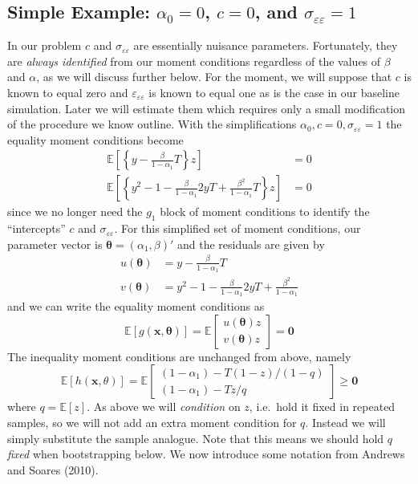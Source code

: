 \documentclass[12pt]{article}
\begin{document}
\subsection{Simple Example: $\alpha_0 = 0$, $c=0$, and $\sigma_{\varepsilon\varepsilon}=1$}
In our problem $c$ and $\sigma_{\varepsilon\varepsilon}$ are essentially nuisance parameters.
Fortunately, they are \emph{always identified} from our moment conditions regardless of the values of $\beta$ and $\alpha$, as we will discuss further below.
For the moment, we will suppose that $c$ is known to equal zero and $\varepsilon_{\varepsilon\varepsilon}$ is known to equal one as is the case in our baseline simulation.
Later we will estimate them which requires only a small modification of the procedure we know outline.
With the simplifications $\alpha_0, c=0, \sigma_{\varepsilon\varepsilon}=1$ the equality moment conditions become
\begin{align*}
  \mathbb{E}\left[ \left\{y - \frac{\beta}{1 - \alpha_1} T\right\}z \right] &= 0\\
  \mathbb{E}\left[ \left\{y^2 - 1 - \frac{\beta}{1 - \alpha_1} 2yT + \frac{\beta^2}{1 - \alpha_1} T\right\}z \right] &= 0 
\end{align*}
since we no longer need the $g_1$ block of moment conditions to identify the ``intercepts'' $c$ and $\sigma_{\varepsilon\varepsilon}$.
For this simplified set of moment conditions, our parameter vector is $\boldsymbol{\theta} = (\alpha_1, \beta)'$ and the residuals are given by
\begin{align*}
  u(\boldsymbol{\theta}) &= y - \frac{\beta}{1 - \alpha_1} T\\
  v(\boldsymbol{\theta}) &= y^2 - 1 - \frac{\beta}{1 - \alpha_1} 2yT + \frac{\beta^2}{1 - \alpha_1}
\end{align*}
and we can write the equality moment conditions as
\[
\mathbb{E}\left[ g(\mathbf{x}, \boldsymbol{\theta}) \right] = \mathbb{E}
  \left[
  \begin{array}{c}
    u(\boldsymbol{\theta}) z\\ v(\boldsymbol{\theta}) z
  \end{array}
\right] = \mathbf{0}
\]
The inequality moment conditions are unchanged from above, namely
\[
  \mathbb{E}\left[ h(\mathbf{x},\theta) \right] = \mathbb{E}
  \left[
  \begin{array}{c}
    (1 - \alpha_1) - T(1 - z)/(1 - q)\\
    (1 - \alpha_1) - Tz/q
  \end{array}
\right] \geq \mathbf{0}
\]
where $q = \mathbb{E}[z]$.
As above we will \emph{condition} on $z$, i.e.\ hold it fixed in repeated samples, so we will not add an extra moment condition for $q$.
Instead we will simply substitute the sample analogue.
Note that this means we should hold $q$ \emph{fixed} when bootstrapping below.
We now introduce some notation from Andrews and Soares (2010).
\end{document}
